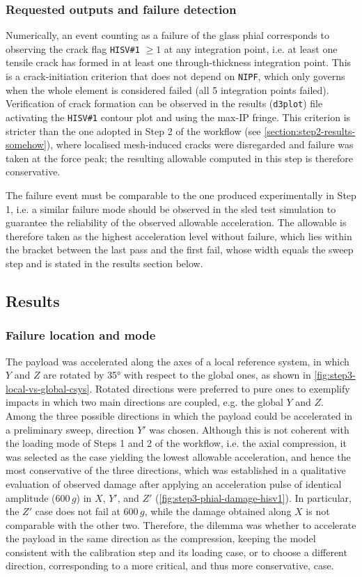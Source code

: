 \subsubsection{Requested outputs and failure detection}
Numerically, an event counting as a failure of the glass phial corresponds to observing the crack flag \texttt{HISV\#1} $\geq 1$ at any integration point, i.e. at least one tensile crack has formed in at least one through-thickness integration point. This is a crack-initiation criterion that does not depend on \texttt{NIPF}, which only governs when the whole element is considered failed (all 5 integration points failed). Verification of crack formation can be observed in the results (\texttt{d3plot}) file activating the \texttt{HISV\#1} contour plot and using the max-IP fringe. This criterion is stricter than the one adopted in Step 2 of the workflow (see \cref{section:step2-results-somehow}), where localised mesh-induced cracks were disregarded and failure was taken at the force peak; the resulting allowable computed in this step is therefore conservative.

The failure event must be comparable to the one produced experimentally in Step 1, i.e. a similar failure mode should be observed in the sled test simulation to guarantee the reliability of the observed allowable acceleration. The allowable is therefore taken as the highest acceleration level without failure, which lies within the bracket between the last pass and the first fail, whose width equals the sweep step and is stated in the results section below.


\subsection{Results}
\subsubsection{Failure location and mode}
The payload was accelerated along the axes of a local reference system, in which $Y$ and $Z$ are rotated by 35° with respect to the global ones, as shown in \cref{fig:step3-local-vs-global-csys}. Rotated directions were preferred to pure ones to exemplify impacts in which two main directions are coupled, e.g. the global $Y$ and $Z$. Among the three possible directions in which the payload could be accelerated in a preliminary sweep, direction $Y'$ was chosen. Although this is not coherent with the loading mode of Steps 1 and 2 of the workflow, i.e. the axial compression, it was selected as the case yielding the lowest allowable acceleration, and hence the most conservative of the three directions, which was established in a qualitative evaluation of observed damage after applying an acceleration pulse of identical amplitude (600\,$g$) in $X$, $Y'$, and $Z'$ (\cref{fig:step3-phial-damage-hisv1}). In particular, the $Z'$ case does not fail at 600\,$g$, while the damage obtained along $X$ is not comparable with the other two. Therefore, the dilemma was whether to accelerate the payload in the same direction as the compression, keeping the model consistent with the calibration step and its loading case, or to choose a different direction, corresponding to a more critical, and thus more conservative, case.

